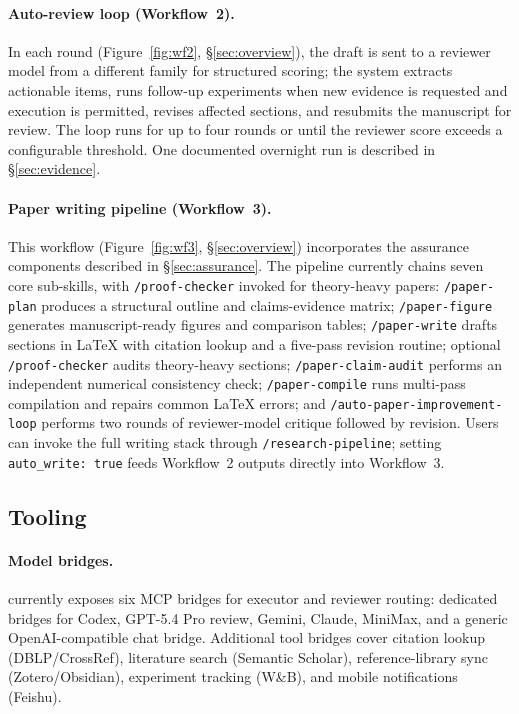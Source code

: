 \paragraph{Auto-review loop (Workflow~2).}
In each round (Figure~\ref{fig:wf2}, \S\ref{sec:overview}), the draft is sent to a reviewer model from a different family for structured scoring; the system extracts actionable items, runs follow-up experiments when new evidence is requested and execution is permitted, revises affected sections, and resubmits the manuscript for review.
The loop runs for up to four rounds or until the reviewer score exceeds a configurable threshold.
One documented overnight run is described in \S\ref{sec:evidence}.

\paragraph{Paper writing pipeline (Workflow~3).}
This workflow (Figure~\ref{fig:wf3}, \S\ref{sec:overview}) incorporates the assurance components described in \S\ref{sec:assurance}.
The pipeline currently chains seven core sub-skills, with \texttt{/proof-checker} invoked for theory-heavy papers:
\texttt{/paper-plan} produces a structural outline and claims-evidence matrix;
\texttt{/paper-figure} generates manuscript-ready figures and comparison tables;
\texttt{/paper-write} drafts sections in \LaTeX{} with citation lookup and a five-pass revision routine;
optional \texttt{/proof-checker} audits theory-heavy sections;
\texttt{/paper-claim-audit} performs an independent numerical consistency check;
\texttt{/paper-compile} runs multi-pass compilation and repairs common \LaTeX{} errors;
and \texttt{/auto-paper-improvement-loop} performs two rounds of reviewer-model critique followed by revision.
Users can invoke the full writing stack through \texttt{/research-pipeline}; setting \texttt{auto\_write: true} feeds Workflow~2 outputs directly into Workflow~3.

\subsection{Tooling}
\label{sec:tools}

\paragraph{Model bridges.}
\aris{} currently exposes six MCP bridges for executor and reviewer routing: dedicated bridges for Codex, GPT-5.4 Pro review, Gemini, Claude, MiniMax, and a generic OpenAI-compatible chat bridge.
Additional tool bridges cover citation lookup (DBLP/CrossRef), literature search (Semantic Scholar), reference-library sync (Zotero/Obsidian), experiment tracking (W\&B), and mobile notifications (Feishu).

